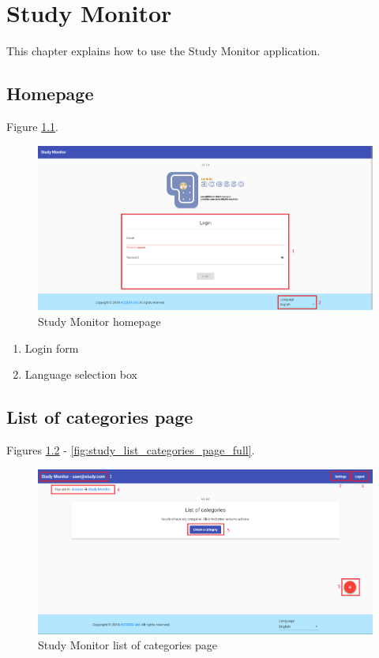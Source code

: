 \chapter{Study Monitor}

This chapter explains how to use the Study Monitor application.

\section{Homepage}

Figure \ref{fig:study_homepage}.

\begin{figure}[H]
    \centering
    \includegraphics[width=\linewidth]{lib/images/study/study_homepage.png}
    \caption{Study Monitor homepage}
    \label{fig:study_homepage}
\end{figure}

\begin{enumerate}
    \item Login form
    \item Language selection box
\end{enumerate}

\section{List of categories page}

Figures \ref{fig:study_list_categories_page_empty} - \ref{fig:study_list_categories_page_full}.

\begin{figure}[H]
    \centering
    \includegraphics[width=\linewidth]{lib/images/study/study_list_categories_page_empty.png}
    \caption{Study Monitor list of categories page}
    \label{fig:study_list_categories_page_empty}
\end{figure}


